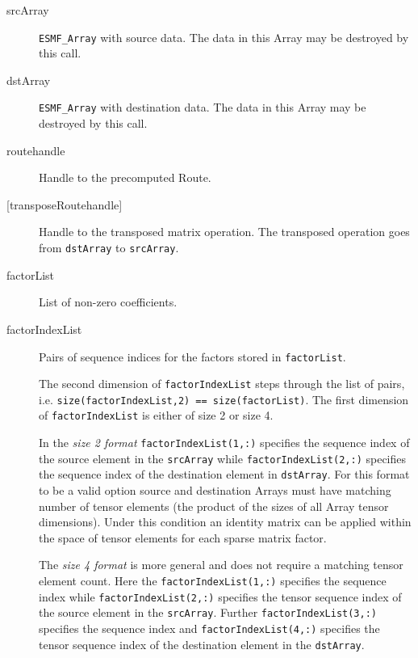      \begin{description}
  
     \item [srcArray]
       {\tt ESMF\_Array} with source data. The data in this Array may be
       destroyed by this call.
  
     \item [dstArray]
       {\tt ESMF\_Array} with destination data. The data in this Array may be
       destroyed by this call.
  
     \item [routehandle]
       Handle to the precomputed Route.
  
     \item [{[transposeRoutehandle]}]
       Handle to the transposed matrix operation. The transposed operation goes
       from {\tt dstArray} to {\tt srcArray}.
  
     \item [factorList]
       List of non-zero coefficients.
  
     \item [factorIndexList]
       Pairs of sequence indices for the factors stored in {\tt factorList}.
  
       \begin{sloppypar}
       The second dimension of {\tt factorIndexList} steps through the list of
       pairs, i.e. {\tt size(factorIndexList,2) == size(factorList)}. The first
       dimension of {\tt factorIndexList} is either of size 2 or size 4.
       \end{sloppypar}
  
       In the {\em size 2 format} {\tt factorIndexList(1,:)} specifies the
       sequence index of the source element in the {\tt srcArray} while
       {\tt factorIndexList(2,:)} specifies the sequence index of the
       destination element in {\tt dstArray}. For this format to be a valid
       option source and destination Arrays must have matching number of
       tensor elements (the product of the sizes of all Array tensor dimensions).
       Under this condition an identity matrix can be applied within the space of
       tensor elements for each sparse matrix factor.
  
       \begin{sloppypar}
       The {\em size 4 format} is more general and does not require a matching
       tensor element count. Here the {\tt factorIndexList(1,:)} specifies the
       sequence index while {\tt factorIndexList(2,:)} specifies the tensor
       sequence index of the source element in the {\tt srcArray}. Further
       {\tt factorIndexList(3,:)} specifies the sequence index and
       {\tt factorIndexList(4,:)} specifies the tensor sequence index of the 
       destination element in the {\tt dstArray}.
       \end{sloppypar}
  

\end{description}
